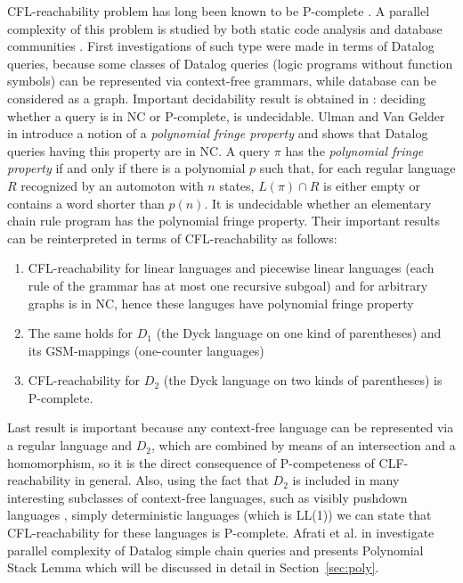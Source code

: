 \documentclass[smallextended]{svjour3}       %
\begin{document}
CFL-reachability problem has long been known to be P-complete \cite{PCompl}. A parallel complexity of this problem is studied by both static code analysis \cite*{RepSeq, RepsBasic} and database communities \cite*{ChainQ, Ullman, Yannakakis}. First investigations of such type were made in terms of Datalog queries, because some classes of Datalog queries (logic programs
without function symbols) can be represented via context-free grammars, while database can be considered as a graph. Important decidability result is obtained in \cite{Vardi}: deciding whether a query is in NC or P-complete, is undecidable. Ulman and Van Gelder in \cite{Ullman} introduce a notion of a  \textit{polynomial fringe property} and shows that Datalog queries having this property are in NC. A query $\pi$ has the \textit{polynomial fringe property} if and only if there is a polynomial $p$ such that, for each regular language $R$ recognized by an automoton with $n$ states, $L(\pi) \cap R$ is either empty or contains a word shorter than $p(n)$. It is undecidable whether an elementary chain rule program has the polynomial fringe property. Their important results can be reinterpreted in terms of CFL-reachability as follows: 
\begin{enumerate}
\item CFL-reachability for linear languages and piecewise linear languages (each rule of the grammar has at most one recursive subgoal) and for arbitrary graphs is in NC, hence these languges have polynomial fringe property
\item The same holds for $D_1$ (the Dyck language on one kind of parentheses) and its GSM-mappings (one-counter languages)
\item CFL-reachability for $D_2$ (the Dyck language on two kinds of parentheses) is P-complete.
\end{enumerate}
Last result is important because any context-free language can be represented via a regular language and $D_2$, which are combined by means of an intersection and a homomorphism, so it is the direct consequence of P-competeness of CLF-reachability in general. Also, using the fact that $D_2$ is included in many interesting subclasses of context-free languages, such as visibly pushdown languages \cite{Okhotin2014ComplexityOI}, simply deterministic languages (which is LL(1)) we can state that CFL-reachability for these languages is P-complete. Afrati et al. in \cite{ChainQ} investigate parallel complexity of Datalog simple chain queries and presents Polynomial Stack Lemma which will be discussed in detail in Section~\ref{sec:poly}. 
\end{document}
